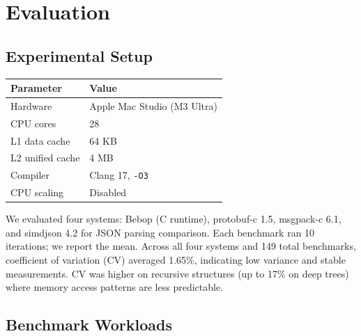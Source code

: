 \documentclass[10pt,onecolumn]{article}
\begin{document}
\newpage
\section{Evaluation}
\label{sec:eval}

\subsection{Experimental Setup}

\begin{table}[ht]
\centering
\begin{tabular}{@{}ll@{}}
\toprule
\textbf{Parameter} & \textbf{Value} \\
\midrule
Hardware & Apple Mac Studio (M3 Ultra) \\
CPU cores & 28 \\
L1 data cache & 64 KB \\
L2 unified cache & 4 MB \\
Compiler & Clang 17, \texttt{-O3} \\
CPU scaling & Disabled \\
\bottomrule
\end{tabular}
\end{table}

We evaluated four systems: Bebop (C runtime), protobuf-c 1.5, msgpack-c 6.1, and simdjson 4.2 for JSON parsing comparison. Each benchmark ran 10 iterations; we report the mean. Across all four systems and 149 total benchmarks, coefficient of variation (CV) averaged 1.65\%, indicating low variance and stable measurements. CV was higher on recursive structures (up to 17\% on deep trees) where memory access patterns are less predictable.

\subsection{Benchmark Workloads}
\end{document}
